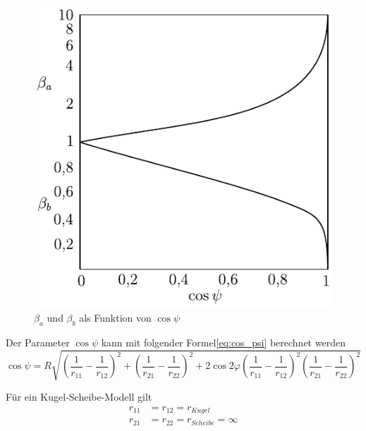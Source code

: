 \begin{figure}[htb]
    \centering
    \includegraphics[]{./images/beta_cos_psi_diagram.pdf}
    \caption{$\beta_a$ und $\beta_b$ als Funktion von $\cos{\psi}$\cite{wisniewski}}
    \label{fig:beta_a_und_beta_b_als_funktion_der_cos_psi}
\end{figure}
%

Der Parameter $\cos{\psi}$ kann mit folgender Formel\ref{eq:cos_psi} berechnet werden
\begin{equation}
    \label{eq:cos_psi}
    \cos{\psi} = R  \sqrt{\left( \frac{1}{r_{11}} - \frac{1}{r_{12}} \right)^2 
                                + \left( \frac{1}{r_{21}} - \frac{1}{r_{22}} \right)^2 
                                + 2  \cos{2 \varphi} 
                                 \left( \frac{1}{r_{11}} - \frac{1}{r_{12}}  \right)^2 
                                 \left( \frac{1}{r_{21}} - \frac{1}{r_{22}} \right)^2}
\end{equation}
%

Für ein Kugel-Scheibe-Modell gilt
%
\begin{align*}
    r_{11} &= r_{12} = r_{Kugel} \\
    r_{21} &= r_{22} = r_{Scheibe} = \infty
\end{align*}
%


